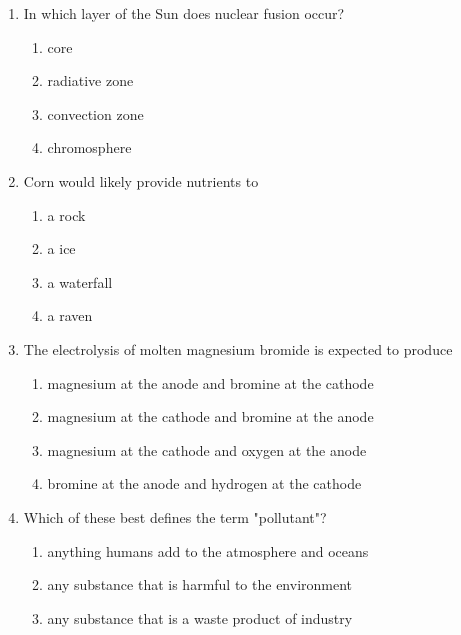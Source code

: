 \documentclass[12pt]{article}
\begin{document}
\begin{enumerate}[label=\arabic*.]
\begin{enumerate}[label=(\alph*)]
    \item the electric field produced by a finite-length charged rod
    \item the electric field produced by an infinitely long charged cylinder
    \item the electric field produced by an infinite plane of charge
    \item the magnetic field produced by an infinitely long, straight current-carrying wire
\end{enumerate}
\item In which layer of the Sun does nuclear fusion occur?
\begin{enumerate}[label=(\alph*)]
    \item core
    \item radiative zone
    \item convection zone
    \item chromosphere
\end{enumerate}
\item Corn would likely provide nutrients to
\begin{enumerate}[label=(\alph*)]
    \item a rock
    \item a ice
    \item a waterfall
    \item a raven
\end{enumerate}
\item The electrolysis of molten magnesium bromide is expected to produce
\begin{enumerate}[label=(\alph*)]
    \item magnesium at the anode and bromine at the cathode
    \item magnesium at the cathode and bromine at the anode
    \item magnesium at the cathode and oxygen at the anode
    \item bromine at the anode and hydrogen at the cathode
\end{enumerate}
\item Which of these best defines the term "pollutant"?
\begin{enumerate}[label=(\alph*)]
    \item anything humans add to the atmosphere and oceans
    \item any substance that is harmful to the environment
    \item any substance that is a waste product of industry

\end{enumerate}
\end{enumerate}
\end{document}
